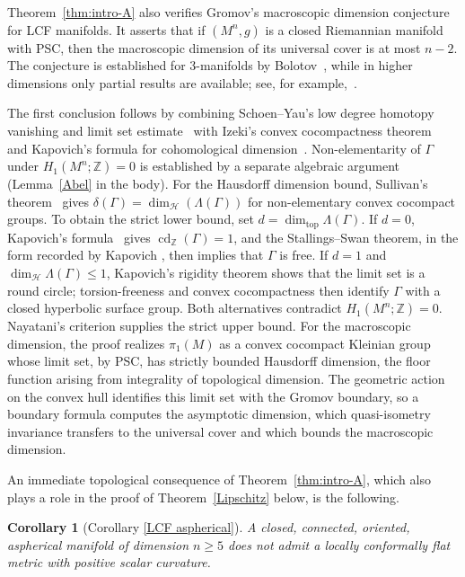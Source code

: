 \documentclass[12pt,oneside,a4paper]{article}
\newtheorem{CorollaryX}{Corollary}
\theoremstyle{mytheorem}
\theoremstyle{remark}
\theoremstyle{definition}
\begin{document}
Theorem~\ref{thm:intro-A} also verifies Gromov's macroscopic dimension conjecture~\cite{zbMATH00867495} for LCF manifolds. It asserts that if $(M^n,g)$ is a closed Riemannian manifold with PSC, then the macroscopic dimension of its universal cover is at most $n-2$. The conjecture is established for $3$-manifolds by Bolotov~\cite{zbMATH01985808}, while in higher dimensions only partial results are available; see, for example,~\cite{zbMATH06371564,zbMATH08005926}.


The first conclusion follows by combining Schoen--Yau's low degree homotopy
vanishing and limit set estimate~\cite{zbMATH04075988} with Izeki's
convex cocompactness theorem~\cite{zbMATH01785298} and Kapovich's formula for
cohomological dimension~\cite[Proposition~9.6]{MR2491697}.
Non-elementarity of $\Gamma$ under $H_1(M^n;\mathbb{Z})=0$ is
established by a separate algebraic argument (Lemma~\ref{Abel} in
the body).  For the Hausdorff dimension bound, Sullivan's
theorem~\cite{zbMATH03903608} gives
$\delta(\Gamma)=\dim_{\mathcal H}(\Lambda(\Gamma))$ for non-elementary
convex cocompact groups.  To obtain the strict lower bound, set
$d=\dim_{\mathrm{top}}\Lambda(\Gamma)$.  If $d=0$, Kapovich's
formula~\cite[Proposition~9.6]{MR2491697} gives
$\operatorname{cd}_{\mathbb Z}(\Gamma)=1$, and the Stallings--Swan theorem,
in the form recorded by Kapovich \cite[Theorem~2.5]{MR2491697}, then implies
that $\Gamma$ is free.  If $d=1$ and
$\dim_{\mathcal H}\Lambda(\Gamma)\le1$, Kapovich's rigidity theorem
\cite[Theorem~1.3]{MR2491697} shows that the limit set is a round circle;
torsion-freeness and convex cocompactness then identify $\Gamma$ with a
closed hyperbolic surface group.  Both alternatives contradict
$H_1(M^n;\mathbb Z)=0$.  Nayatani's criterion
\cite[Corollary~3.4]{zbMATH01028179} supplies the strict upper bound.  For
the macroscopic dimension, the proof realizes \(\pi_1(M)\) as a convex cocompact Kleinian group whose limit set, by PSC, has strictly bounded Hausdorff dimension, the floor function arising from integrality of topological
dimension.  The geometric action on the convex hull identifies this limit set with
the Gromov boundary, so a boundary formula computes the asymptotic dimension, which
quasi-isometry invariance transfers to the universal cover and which bounds the
macroscopic dimension.


An immediate topological consequence of Theorem~\ref{thm:intro-A}, which also plays a
role in the proof of Theorem~\ref{Lipschitz} below, is the following.

\begin{CorollaryX}[Corollary \ref{LCF aspherical}]\label{CorollaryB}
A closed, connected, oriented, aspherical manifold of dimension $n\geq5$ does not admit a
locally conformally flat metric with positive scalar curvature.
\end{CorollaryX}
\end{document}
